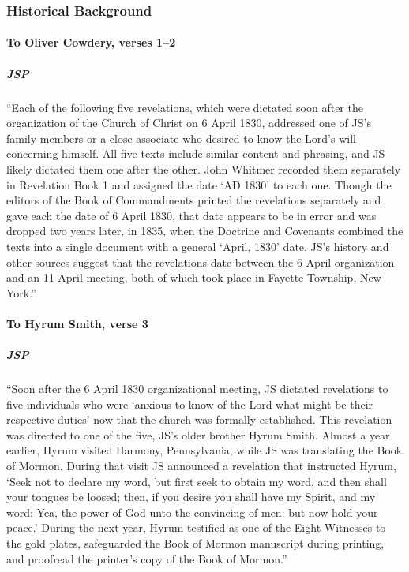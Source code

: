 	\subsubsection{Historical Background}
		\label{DC23-HB}
		
		\paragraph{To Oliver Cowdery, verses 1--2}
		
			\subparagraph{JSP}
		
				``Each of the following five revelations, which were dictated soon after the organization of the Church of Christ on 6 April 1830, addressed one of JS's family members or a close associate who desired to know the Lord's will concerning himself. All five texts include similar content and phrasing, and JS likely dictated them one after the other. John Whitmer recorded them separately in Revelation Book 1 and assigned the date `AD 1830' to each one. Though the editors of the Book of Commandments printed the revelations separately and gave each the date of 6 April 1830, that date appears to be in error and was dropped two years later, in 1835, when the Doctrine and Covenants combined the texts into a single document with a general `April, 1830' date. JS's history and other sources suggest that the revelations date between the 6 April organization and an 11 April meeting, both of which took place in Fayette Township, New York.''
		
		\paragraph{To Hyrum Smith, verse 3}
		
			\subparagraph{JSP}
				
				``Soon after the 6 April 1830 organizational meeting, JS dictated revelations to five individuals who were `anxious to know of the Lord what might be their respective duties' now that the church was formally established. This revelation was directed to one of the five, JS's older brother Hyrum Smith. Almost a year earlier, Hyrum visited Harmony, Pennsylvania, while JS was translating the Book of Mormon. During that visit JS announced a revelation that instructed Hyrum, `Seek not to declare my word, but first seek to obtain my word, and then shall your tongues be loosed; then, if you desire you shall have my Spirit, and my word: Yea, the power of God unto the convincing of men: but now hold your peace.' During the next year, Hyrum testified as one of the Eight Witnesses to the gold plates, safeguarded the Book of Mormon manuscript during printing, and proofread the printer's copy of the Book of Mormon.''

